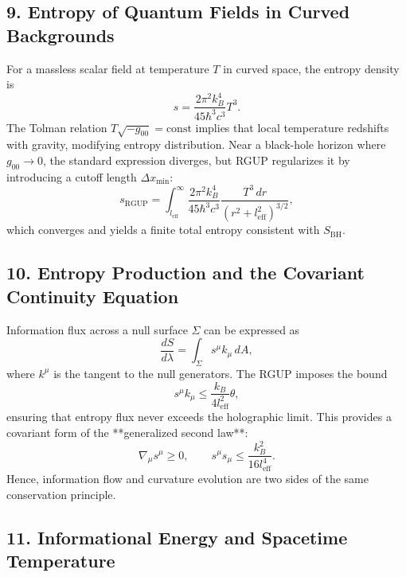 \documentclass[11pt,oneside]{book}
\numberwithin{equation}{chapter}
\begin{document}
\subsection*{9. Entropy of Quantum Fields in Curved Backgrounds}

For a massless scalar field at temperature $T$ in curved space, the entropy density is
\begin{equation}
s = \frac{2\pi^2 k_B^4}{45\hbar^3 c^3}T^3.
\end{equation}
The Tolman relation $T\sqrt{-g_{00}}=\text{const}$ implies that local temperature redshifts with gravity, modifying entropy distribution.  
Near a black-hole horizon where $g_{00}\to0$, the standard expression diverges, but RGUP regularizes it by introducing a cutoff length $\Delta x_{\min}$:
\begin{equation}
s_{\text{RGUP}} = 
\int_{l_{\text{eff}}}^{\infty}
\frac{2\pi^2 k_B^4}{45\hbar^3 c^3}
\frac{T^3\,dr}{(r^2+l_{\text{eff}}^2)^{3/2}},
\end{equation}
which converges and yields a finite total entropy consistent with $S_{\text{BH}}$.

\subsection*{10. Entropy Production and the Covariant Continuity Equation}

Information flux across a null surface $\Sigma$ can be expressed as
\begin{equation}
\frac{dS}{d\lambda} = 
\int_\Sigma s^\mu k_\mu\,dA,
\end{equation}
where $k^\mu$ is the tangent to the null generators.  
The RGUP imposes the bound
\begin{equation}
s^\mu k_\mu \le \frac{k_B}{4l_{\text{eff}}^2}\theta,
\end{equation}
ensuring that entropy flux never exceeds the holographic limit.  
This provides a covariant form of the **generalized second law**:
\begin{equation}
\nabla_\mu s^\mu \ge 0,
\qquad
s^\mu s_\mu \le \frac{k_B^2}{16 l_{\text{eff}}^4}.
\end{equation}
Hence, information flow and curvature evolution are two sides of the same conservation principle.

\subsection*{11. Informational Energy and Spacetime Temperature}
\end{document}
